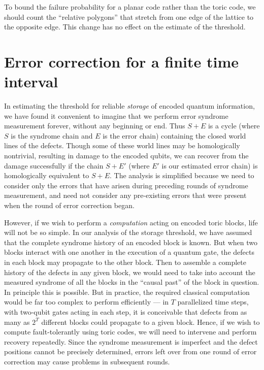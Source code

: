 To bound the failure probability for a planar code rather than the toric code, we should count the ``relative polygons'' that stretch from one edge of the lattice to the opposite edge. This change has no effect on the estimate of the threshold.

\section{Error correction for a finite time interval}
\label{sec:finite_time}

In estimating the threshold for reliable {\em storage} of encoded quantum information, we have found it convenient to imagine that we perform error syndrome measurement forever, without any beginning or end. Thus $S+E$ is a cycle (where $S$ is the syndrome chain and $E$ is the error chain) containing the closed world lines of the defects. Though some of these world lines may be homologically nontrivial, resulting in damage to the encoded qubits, we can recover from the damage successfully if the chain $S+E'$ (where $E'$ is our estimated error chain) is homologically equivalent to $S+E$. The analysis is simplified because we need to consider only the errors that have arisen during preceding rounds of syndrome measurement, and need not consider any pre-existing errors that were present when the round of error correction began. 

However, if we wish to perform a {\em computation} acting on encoded toric
blocks, life will not be so simple.  In our analysis of the storage threshold, we have assumed that the complete syndrome history of an encoded block is known. But when two blocks interact with one another
in the execution of a quantum gate, the defects in each block may propagate to
the other block. Then to assemble a complete history of the defects in any
given block, we would need to take into account the measured syndrome of all
the blocks in the ``causal past'' of the block in question.  In principle this is possible. But in practice, the required classical computation would be far too complex to perform efficiently --- in $T$ parallelized time steps, with two-qubit gates acting in each step, it is
conceivable that defects from as many as $2^T$ different blocks could propagate
to a given block.  Hence, if we wish to compute fault-tolerantly using toric codes, we will need to intervene and perform recovery repeatedly. Since the syndrome measurement is imperfect and the defect positions cannot be precisely determined, errors left over from one round of error correction may cause problems in subsequent rounds.

